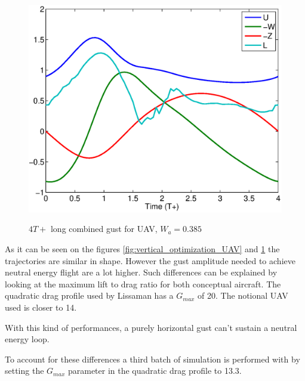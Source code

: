 \begin{figure}[h]
  \begin{center}
    \scalebox{0.8}
    {\includegraphics{./Figures/Windtype=3_Tg=4_Wg=0p387_UAV_alphamax=12.eps}}
  \end{center}
  \caption{$4T+$ long combined gust for UAV, $W_a=0.385$}
  \label{fig:combined_optimization_UAV}
\end{figure}

As it can be seen on the figures \ref{fig:vertical_optimization_UAV} and \ref{fig:combined_optimization_UAV} the trajectories are similar in shape. However the gust amplitude needed to achieve neutral energy flight are a lot higher.
Such differences can be explained by looking at the maximum lift to drag ratio for both conceptual aircraft.
The quadratic drag profile used by Lissaman has a $G_{max}$ of 20.
The notional UAV used is closer to 14.

\FloatBarrier

\par With this kind of performances, a purely horizontal gust can't sustain a neutral energy loop.


\par To account for these differences a third batch of simulation is performed with by setting the $G_{max}$ parameter in the quadratic drag profile to 13.3.

